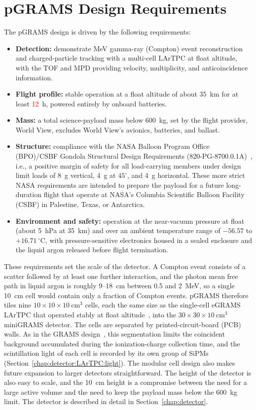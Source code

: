 \documentclass[a4paper,fleqn,longmktitle]{cas-dc}
\begin{document}
\section{pGRAMS Design Requirements}\label{chap:design}
The pGRAMS design is driven by the following requirements:
\begin{itemize}
    \item \textbf{Detection:} demonstrate MeV gamma-ray (Compton) event reconstruction and charged-particle tracking with a multi-cell LArTPC at float altitude, with the TOF and MPD providing velocity, multiplicity, and anticoincidence information.
    \item \textbf{Flight profile:} stable operation at a float altitude of about 35~km for at least \textcolor{red}{12}~h, powered entirely by onboard batteries.
    \item \textbf{Mass:} a total science-payload mass below 600~kg, set by the flight provider, World View, excludes World View's avionics, batteries, and ballast.
    \item \textbf{Structure:} compliance with the NASA Balloon Program Office (BPO)/CSBF Gondola Structural Design Requirements (820-PG-8700.0.1A)~\cite{csbf_gondola_docs}, i.e., a positive margin of safety for all load-carrying members under design limit loads of 8~g vertical, 4~g at $45^{\circ}$, and 4~g horizontal. These more strict NASA requirements are intended to prepare the payload for a future long-duration flight that operate at NASA's Columbia Scientific Balloon Facility (CSBF) in Palestine, Texas, or Antarctica.
    \item \textbf{Environment and safety:} operation at the near-vacuum pressure at float (about 5~hPa at 35~km) and over an ambient temperature range of $-56.57$ to $+16.71\,^{\circ}$C, with pressure-sensitive electronics housed in a sealed enclosure and the liquid argon released before flight termination.
\end{itemize}
 
These requirements set the scale of the detector.
A Compton event consists of a scatter followed by at least one further interaction, and the photon mean free path in liquid argon is roughly 9--18~cm between 0.5 and 2~MeV, so a single 10~cm cell would contain only a fraction of Compton events.
pGRAMS therefore tiles nine $10\times10\times10~\mathrm{cm^3}$ cells, each the same size as the single-cell eGRAMS LArTPC that operated stably at float altitude~\cite{Nakajima:2024fgx}, into the $30\times30\times10~\mathrm{cm^3}$ miniGRAMS detector.
The cells are separated by printed-circuit-board (PCB) walls.
As in the GRAMS design~\cite{aramaki2020dual}, this segmentation limits the coincident background accumulated during the ionization-charge collection time, and the scintillation light of each cell is recorded by its own group of SiPMs (Section~\ref{chap:detector:LArTPC:light}).
The modular cell design also makes future expansion to larger detectors straightforward. The height of the detector is also easy to scale, and the 10~cm height is a compromise between the need for a large active volume and the need to keep the payload mass below the 600~kg limit.
The detector is described in detail in Section~\ref{chap:detector}.
 
\end{document}
